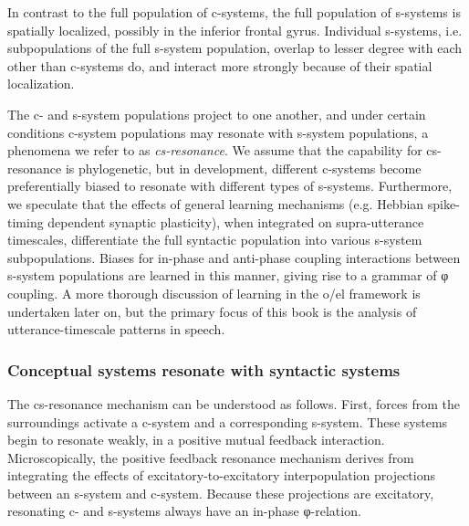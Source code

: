   In contrast to the full population of c-systems, the full population of s-systems is spatially localized, possibly in the inferior frontal gyrus. Individual s-systems, i.e. subpopulations of the full s-system population, overlap to lesser degree with each other than c-systems do, and interact more strongly because of their spatial localization. 

  The c- and s-system populations project to one another, and under certain conditions c-system populations may resonate with s-system populations, a phenomena we refer to as \textit{cs-resonance}. We assume that the capability for cs-resonance is phylogenetic, but in development, different c-systems become preferentially biased to resonate with different types of s-systems. Furthermore, we speculate that the effects of general learning mechanisms (e.g. Hebbian spike-timing dependent synaptic plasticity), when integrated on supra-utterance timescales, differentiate the full syntactic population into various s-system subpopulations. Biases for in-phase and anti-phase coupling interactions between s-system populations are learned in this manner, giving rise to a grammar of φ coupling. A more thorough discussion of learning in the o/el framework is undertaken later on, but the primary focus of this book is the analysis of utterance-timescale patterns in speech.

\subsubsection{Conceptual systems resonate with syntactic systems}

The cs-resonance mechanism can be understood as follows. First, forces from the surroundings activate a c-system and a corresponding s-system. These systems begin to resonate weakly, in a positive mutual feedback interaction. Microscopically, the positive feedback resonance mechanism derives from integrating the effects of excitatory-to-excitatory interpopulation projections between an s-system and c-system. Because these projections are excitatory, resonating c- and s-systems always have an in-phase φ-relation. 

